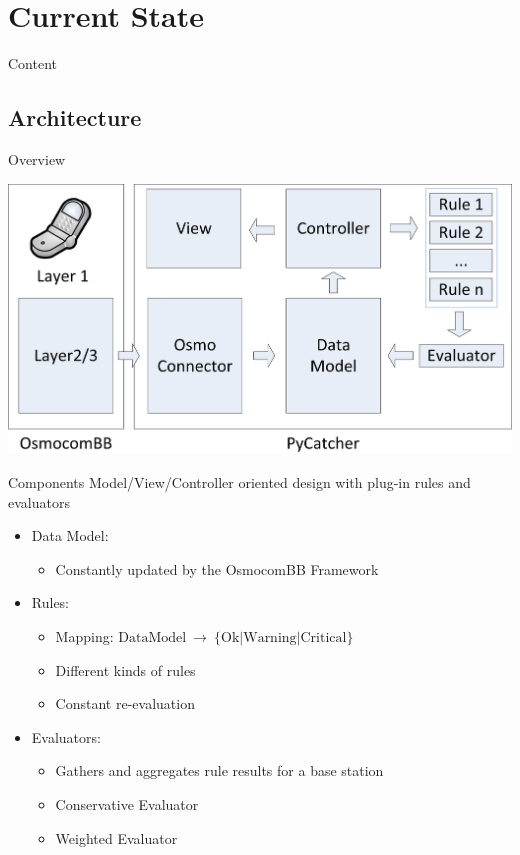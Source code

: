 \documentclass{beamer}
\newcommand{\tocsection}[1]{
  \section{#1}
  \begin{frame}{Content}
    \tableofcontents[sectionstyle=show/shaded,subsectionstyle=show/show/hide]
  \end{frame}
 }
\begin{document}
\tocsection{Current State}
\subsection{Architecture}
\begin{frame}{Overview}
\begin{center}
	\includegraphics[width=\textwidth]{Architecture}
\end{center}

\end{frame}

\begin{frame}{Components}
Model/View/Controller oriented design with plug-in rules and evaluators
\begin{itemize}
	\item Data Model:
	\begin{itemize}
		\item Constantly updated by the OsmocomBB Framework
	\end{itemize}
	\item Rules:
	\begin{itemize}
		\item Mapping: $\text{DataModel}~\rightarrow~\{\text{Ok}\vert\text{Warning}\vert\text{Critical}\}$
		\item Different kinds of rules
		\item Constant re-evaluation
	\end{itemize}
	\item Evaluators:
	\begin{itemize}
		\item Gathers and aggregates rule results for a base station
		\item Conservative Evaluator
		\item Weighted Evaluator
	\end{itemize}
\end{itemize}
\end{frame}
\end{document}
